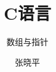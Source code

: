 \documentclass[11pt]{beamer}
\begin{document}
\title{C语言}
\subtitle{数组与指针}

\author{张晓平}


\begin{frame}[plain]\transboxout
  \titlepage
\end{frame}



\end{document}
